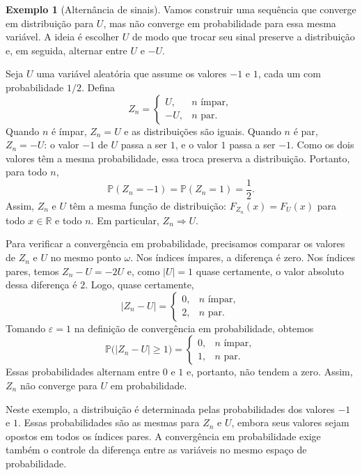 \documentclass[12pt,portuguese]{article}
\theoremstyle{definition}
\newtheorem{example}[example]{Exemplo}
\theoremstyle{plainexercise}
\theoremstyle{starredexercise}
\theoremstyle{definition}
\begin{document}
\begin{example}[Alternância de sinais]
\label{ex:dist-sem-prob}
Vamos construir uma sequência que converge em distribuição para $U$, mas não
converge em probabilidade para essa mesma variável. A ideia é escolher $U$ de
modo que trocar seu sinal preserve a distribuição e, em seguida, alternar
entre $U$ e $-U$.

Seja $U$ uma variável aleatória que assume os valores $-1$ e $1$, cada um com
probabilidade $1/2$. Defina
\[
Z_n=
\begin{cases}
U, & n\text{ ímpar},\\
-U, & n\text{ par}.
\end{cases}
\]
Quando $n$ é ímpar, $Z_n=U$ e as distribuições são iguais. Quando $n$ é par,
$Z_n=-U$: o valor $-1$ de $U$ passa a ser $1$, e o valor $1$ passa a ser $-1$.
Como os dois valores têm a mesma probabilidade, essa troca preserva a
distribuição. Portanto, para todo $n$,
\[
\mathbb{P}(Z_n=-1)=\mathbb{P}(Z_n=1)=\frac{1}{2}.
\]
Assim, $Z_n$ e $U$ têm a mesma função de distribuição:
$F_{Z_n}(x)=F_U(x)$ para todo $x\in\mathbb{R}$ e todo $n$.
Em particular, $Z_n\Rightarrow U$.

Para verificar a convergência em probabilidade, precisamos comparar os
valores de $Z_n$ e $U$ no mesmo ponto $\omega$. Nos índices ímpares, a
diferença é zero. Nos índices pares, temos $Z_n-U=-2U$ e, como $|U|=1$ quase
certamente, o valor absoluto dessa diferença é $2$. Logo, quase certamente,
\[
|Z_n-U|=
\begin{cases}
0, & n\text{ ímpar},\\
2, & n\text{ par}.
\end{cases}
\]
Tomando $\varepsilon=1$ na definição de convergência em probabilidade,
obtemos
\[
\mathbb{P}\bigl(|Z_n-U|\geqslant1\bigr)=
\begin{cases}
0, & n\text{ ímpar},\\
1, & n\text{ par}.
\end{cases}
\]
Essas probabilidades alternam entre $0$ e $1$ e, portanto, não tendem a zero.
Assim, $Z_n$ não converge para $U$ em probabilidade.

Neste exemplo, a distribuição é determinada pelas probabilidades dos valores
$-1$ e $1$. Essas probabilidades são as mesmas para $Z_n$ e $U$, embora seus
valores sejam opostos em todos os índices pares. A convergência em
probabilidade exige também o controle da diferença entre as variáveis no
mesmo espaço de probabilidade.
\end{example}
\end{document}
